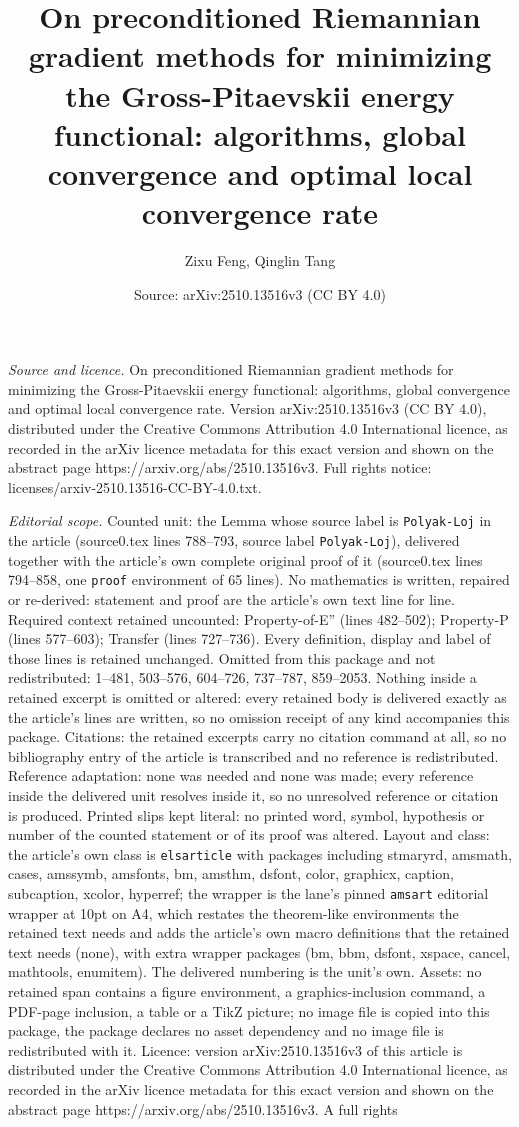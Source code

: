 \documentclass[10pt,a4paper]{amsart}
\title[On preconditioned Riemannian gradient methods for minimizing]{On preconditioned Riemannian gradient methods for minimizing the Gross-Pitaevskii energy functional: algorithms, global convergence and optimal local convergence rate}
\author{Zixu Feng, Qinglin Tang}
\date{Source: arXiv:2510.13516v3 (CC BY 4.0)}
\begin{document}
\maketitle

\noindent\emph{Source and licence.} On preconditioned Riemannian gradient methods for minimizing the Gross-Pitaevskii energy functional: algorithms, global convergence and optimal local convergence rate. Version arXiv:2510.13516v3 (CC BY 4.0), distributed under the Creative Commons Attribution 4.0 International licence, as recorded in the arXiv licence metadata for this exact version and shown on the abstract page https://arxiv.org/abs/2510.13516v3. Full rights notice: licenses/arxiv-2510.13516-CC-BY-4.0.txt.\par\smallskip

\noindent\textit{Editorial scope.} Counted unit: the Lemma whose source label is \texttt{Polyak-Loj} in the article (source0.tex lines 788--793, source label \texttt{Polyak-Loj}), delivered together with the article's own complete original proof of it (source0.tex lines 794--858, one \texttt{proof} environment of 65 lines). No mathematics is written, repaired or re-derived: statement and proof are the article's own text line for line. Required context retained uncounted: Property-of-E'' (lines 482--502); Property-P (lines 577--603); Transfer (lines 727--736). Every definition, display and label of those lines is retained unchanged. Omitted from this package and not redistributed: 1--481, 503--576, 604--726, 737--787, 859--2053. Nothing inside a retained excerpt is omitted or altered: every retained body is delivered exactly as the article's lines are written, so no omission receipt of any kind accompanies this package. Citations: the retained excerpts carry no citation command at all, so no bibliography entry of the article is transcribed and no reference is redistributed. Reference adaptation: none was needed and none was made; every reference inside the delivered unit resolves inside it, so no unresolved reference or citation is produced. Printed slips kept literal: no printed word, symbol, hypothesis or number of the counted statement or of its proof was altered. Layout and class: the article's own class is \texttt{elsarticle} with packages including stmaryrd, amsmath, cases, amssymb, amsfonts, bm, amsthm, dsfont, color, graphicx, caption, subcaption, xcolor, hyperref; the wrapper is the lane's pinned \texttt{amsart} editorial wrapper at 10pt on A4, which restates the theorem-like environments the retained text needs and adds the article's own macro definitions that the retained text needs (none), with extra wrapper packages (bm, bbm, dsfont, xspace, cancel, mathtools, enumitem). The delivered numbering is the unit's own. Assets: no retained span contains a figure environment, a graphics-inclusion command, a PDF-page inclusion, a table or a TikZ picture; no image file is copied into this package, the package declares no asset dependency and no image file is redistributed with it. Licence: version arXiv:2510.13516v3 of this article is distributed under the Creative Commons Attribution 4.0 International licence, as recorded in the arXiv licence metadata for this exact version and shown on the abstract page https://arxiv.org/abs/2510.13516v3. A full rights 
\end{document}
